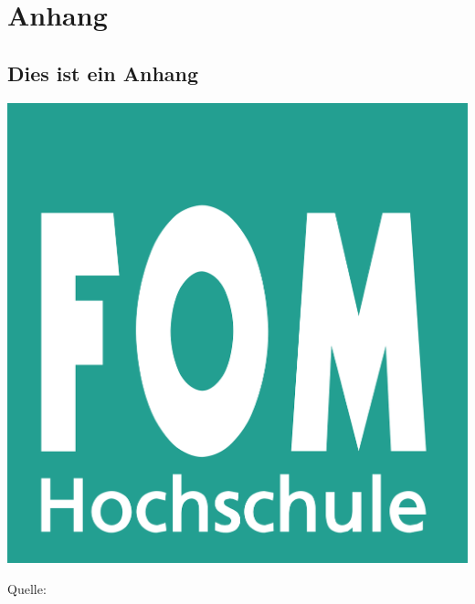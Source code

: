
\chapter*{Anhang}
\renewcommand\thesection{Anhang \arabic{section}:} %

\begin{minipage}{\textwidth}
	\section{Dies ist ein Anhang}
	\label{anh:beispiel}
	\includegraphics[width=0.5\linewidth]{Abbildungen/fom_logo.png} 
	\par\smallskip
	Quelle: \cite{logo}
\end{minipage}

\renewcommand\thesection{\thechapter.\arabic{section}}
